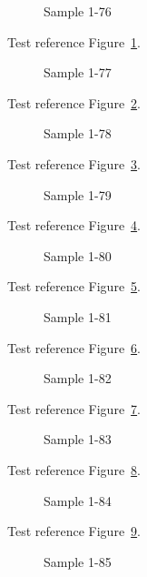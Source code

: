 \begin{figure}[tbhp]
\caption{Sample 1-76}
\label{fig:sample-1-76}
\end{figure}

Test reference Figure~\ref{fig:sample-1-76}.

\begin{figure}[tbhp]
\caption{Sample 1-77}
\label{fig:sample-1-77}
\end{figure}

Test reference Figure~\ref{fig:sample-1-77}.

\begin{figure}[tbhp]
\caption{Sample 1-78}
\label{fig:sample-1-78}
\end{figure}

Test reference Figure~\ref{fig:sample-1-78}.

\begin{figure}[tbhp]
\caption{Sample 1-79}
\label{fig:sample-1-79}
\end{figure}

Test reference Figure~\ref{fig:sample-1-79}.

\begin{figure}[tbhp]
\caption{Sample 1-80}
\label{fig:sample-1-80}
\end{figure}

Test reference Figure~\ref{fig:sample-1-80}.

\begin{figure}[tbhp]
\caption{Sample 1-81}
\label{fig:sample-1-81}
\end{figure}

Test reference Figure~\ref{fig:sample-1-81}.

\begin{figure}[tbhp]
\caption{Sample 1-82}
\label{fig:sample-1-82}
\end{figure}

Test reference Figure~\ref{fig:sample-1-82}.

\begin{figure}[tbhp]
\caption{Sample 1-83}
\label{fig:sample-1-83}
\end{figure}

Test reference Figure~\ref{fig:sample-1-83}.

\begin{figure}[tbhp]
\caption{Sample 1-84}
\label{fig:sample-1-84}
\end{figure}

Test reference Figure~\ref{fig:sample-1-84}.

\begin{figure}[tbhp]
\caption{Sample 1-85}
\label{fig:sample-1-85}
\end{figure}

